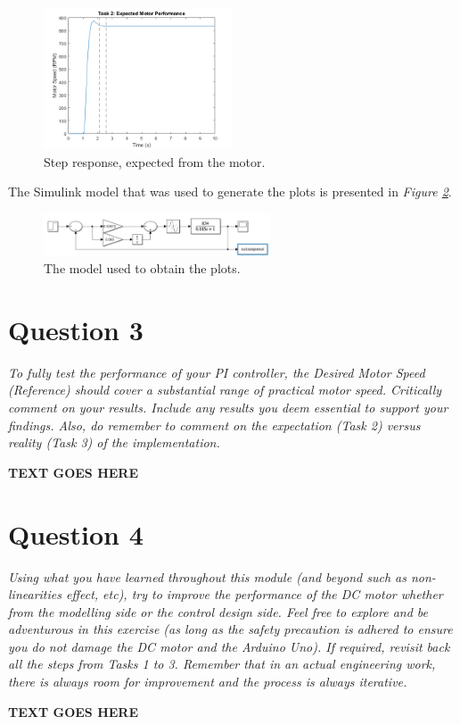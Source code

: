 \documentclass[11pt, onecolumn]{article}
\begin{document}
\begin{figure}[h!]
    \centering
    \includegraphics[width=0.5\textwidth]{q2-g4.png}
    \caption{Step response, expected from the motor.}
    \label{fig:q2-third}
\end{figure}
\par The Simulink model that was used to generate the plots is presented in \textit{Figure \ref{fig:q2-model}}.
\begin{figure}[h!]
    \centering
    \includegraphics[width=0.6\textwidth]{q2-model.png}
    \caption{The model used to obtain the plots.}
    \label{fig:q2-model}
\end{figure}
\section*{Question 3}
\par \textit{To fully test the performance of your PI controller, the Desired Motor Speed (Reference) should cover a substantial range of practical motor speed. Critically comment on your results. Include any results you deem essential to support your findings. Also, do remember to comment on the expectation (Task 2) versus reality (Task 3) of the implementation.}
\noindent\makebox[\linewidth]{\rule{\textwidth}{0.4pt}}
\par \textbf{TEXT GOES HERE}
\section*{Question 4}
\par \textit{Using what you have learned throughout this module (and beyond such as non- linearities effect, etc), try to improve the performance of the DC motor whether from the modelling side or the control design side. Feel free to explore and be adventurous in this exercise (as long as the safety precaution is adhered to ensure you do not damage the DC motor and the Arduino Uno). If required, revisit back all the steps from Tasks 1 to 3. Remember that in an actual engineering work, there is always room for improvement and the process is always iterative.}
\noindent\makebox[\linewidth]{\rule{\textwidth}{0.4pt}}
\par \textbf{TEXT GOES HERE}


\end{document}
